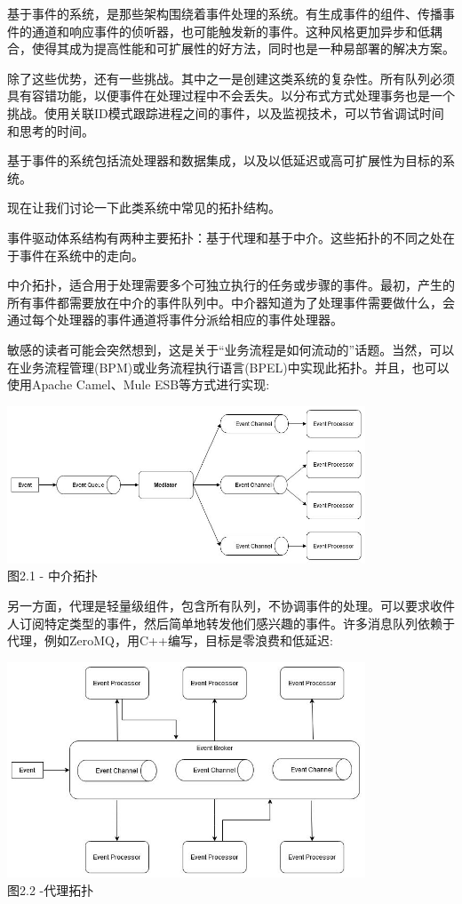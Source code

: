 
基于事件的系统，是那些架构围绕着事件处理的系统。有生成事件的组件、传播事件的通道和响应事件的侦听器，也可能触发新的事件。这种风格更加异步和低耦合，使得其成为提高性能和可扩展性的好方法，同时也是一种易部署的解决方案。

除了这些优势，还有一些挑战。其中之一是创建这类系统的复杂性。所有队列必须具有容错功能，以便事件在处理过程中不会丢失。以分布式方式处理事务也是一个挑战。使用关联ID模式跟踪进程之间的事件，以及监视技术，可以节省调试时间和思考的时间。

基于事件的系统包括流处理器和数据集成，以及以低延迟或高可扩展性为目标的系统。

现在让我们讨论一下此类系统中常见的拓扑结构。


事件驱动体系结构有两种主要拓扑：基于代理和基于中介。这些拓扑的不同之处在于事件在系统中的走向。

中介拓扑，适合用于处理需要多个可独立执行的任务或步骤的事件。最初，产生的所有事件都需要放在中介的事件队列中。中介器知道为了处理事件需要做什么，会通过每个处理器的事件通道将事件分派给相应的事件处理器。 

敏感的读者可能会突然想到，这是关于“业务流程是如何流动的”话题。当然，可以在业务流程管理(BPM)或业务流程执行语言(BPEL)中实现此拓扑。并且，也可以使用Apache Camel、Mule ESB等方式进行实现:

\begin{center}
\includegraphics[width=0.8\textwidth]{content/1/chapter2/images/1.jpg}\\
图2.1 - 中介拓扑
\end{center}

另一方面，代理是轻量级组件，包含所有队列，不协调事件的处理。可以要求收件人订阅特定类型的事件，然后简单地转发他们感兴趣的事件。许多消息队列依赖于代理，例如ZeroMQ，用C++编写，目标是零浪费和低延迟:

\begin{center}
\includegraphics[width=0.8\textwidth]{content/1/chapter2/images/2.jpg}\\
图2.2 -代理拓扑
\end{center}

